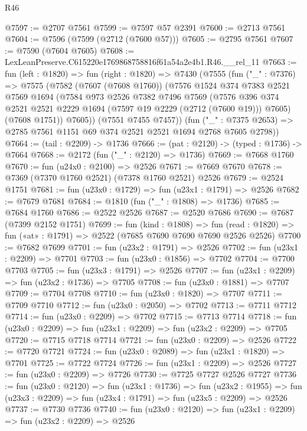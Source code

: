 \begin{lexlean}{R46}
\begin{coremodule}
@7597 := @2707 @7561
@7599 := @7597 @57 @2391
@7600 := @2713 @7561
@7604 := @7596 (@7599 (@2712 (@7600 @57)))
@7605 := @2795 @7561
@7607 := @7590 (@7604 @7605)
@7608 := LexLeanPreserve.C615220e1769868758816f61a54a2e4b1.R46.__rel_11
@7663 := fun (left : @1820) =>
  fun (right : @1820) =>
  @7430
    (@7555
      (fun ("_" : @7376) =>
      @7575
        (@7582
          (@7607 (@7608 @1760))
          (@7576
            @1524
            @374
            @7383
            @2521
            @7569
            @1694
            (@7584
              @973
              @2526
              @7382
              @7496
              @7569
              (@7576 @396 @374 @2521 @2521 @2229 @1694 (@7597 @19 @2229 (@2712 (@7600 @19))) @7605)
              (@7608 @1751))
            @7605))
        (@7551 @7455 @7457))
      (fun ("_" : @7375 @2653) => @2785 @7561 @1151 @69 @374 @2521 @2521 @1694 @2768 @7605 @2798))
@7664 := (tail : @2209) -> @1736
@7666 := (pat : @2120) -> (typed : @1736) -> @7664
@7668 := @2172 (fun ("_" : @2120) => @1736)
@7669 := @7668 @1760
@7670 := fun (u24x0 : @2100) => @2526
@7671 := @7669 @7670
@7678 := @7369 (@7370 @1760 @2521) (@7378 @1760 @2521) @2526
@7679 := @2524 @1751
@7681 := fun (u23x0 : @1729) => fun (u23x1 : @1791) => @2526
@7682 := @7679 @7681
@7684 := @1810 (fun ("_" : @1808) => @1736)
@7685 := @7684 @1760
@7686 := @2522 @2526
@7687 := @2520 @7686
@7690 := @7687 (@7399 @2152 @1751)
@7699 := fun (kind : @1808) =>
  fun (read : @1820) => fun («at» : @1791) => @2522 (@7685 @7690 @7690 @7690 @2526 @2526)
@7700 := @7682 @7699
@7701 := fun (u23x2 : @1791) => @2526
@7702 := fun (u23x1 : @2209) => @7701
@7703 := fun (u23x0 : @1856) => @7702
@7704 := @7700 @7703
@7705 := fun (u23x3 : @1791) => @2526
@7707 := fun (u23x1 : @2209) => fun (u23x2 : @1736) => @7705
@7708 := fun (u23x0 : @1881) => @7707
@7709 := @7704 @7708
@7710 := fun (u23x0 : @1820) => @7707
@7711 := @7709 @7710
@7712 := fun (u23x0 : @2050) => @7702
@7713 := @7711 @7712
@7714 := fun (u23x0 : @2209) => @7702
@7715 := @7713 @7714
@7718 := fun (u23x0 : @2209) => fun (u23x1 : @2209) => fun (u23x2 : @2209) => @7705
@7720 := @7715 @7718 @7714
@7721 := fun (u23x0 : @2209) => @2526
@7722 := @7720 @7721
@7724 := fun (u23x0 : @2089) => fun (u23x1 : @1820) => @7701
@7725 := @7722 @7724
@7726 := fun (u23x1 : @2209) => @2526
@7727 := fun (u23x0 : @2209) => @7726
@7730 := @7725 @7727 @2526 @7727
@7736 := fun (u23x0 : @2120) =>
  fun (u23x1 : @1736) =>
  fun (u23x2 : @1955) => fun (u23x3 : @2209) => fun (u23x4 : @1791) => fun (u23x5 : @2209) => @2526
@7737 := @7730 @7736
@7740 := fun (u23x0 : @2120) => fun (u23x1 : @2209) => fun (u23x2 : @2209) => @2526

\end{coremodule}
\end{lexlean}
